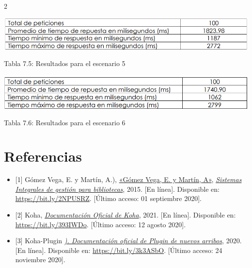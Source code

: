 \documentclass[12pt,spanish,Letterpaper,openany]{book}
\begin{document}
\begin {multicols}{2}
\begin {center}
\begin{minipage}[c]{\columnwidth}
\begin{center}\includegraphics[width=1\linewidth]{images/05_12} \end{center}
\vspace{0.01cm}
\footnotesize
\centering

Tabla 7.5: Resultados para el escenario 5

\end{minipage}

\end {center}

\begin {center}

\noindent\begin{minipage}[c]{\columnwidth}
\centering

\begin{center}\includegraphics[width=1\linewidth]{images/05_13} \end{center}
\vspace{0.01cm}
\footnotesize
\centering

Tabla 7.6: Resultados para el escenario 6

\end{minipage}

\end {center}

\hypertarget{referencias-4}{%
\section{Referencias}\label{referencias-4}}

\begin{itemize}
\item
  {[}1{]} Gómez Vega, E. y Martín, A.), \href{https://www.ntust.edu.tw/}{«Gómez Vega, E. y Martín, A»}, \href{https://bit.ly/3z0577S}{\emph{Sistemas Integrales de gestión para bibliotecas}}, 2015. {[}En línea{]}. Disponible en: \url{https://bit.ly/2NPUSRZ}. {[}Último acceso: 01 septiembre 2020{]}.
\item
  {[}2{]} Koha, \href{https://koha-community.org/documentation/}{\emph{Documentación Oficial de Koha}}, 2021. {[}En línea{]}. Disponible en: \url{https://bit.ly/393IWDo}. {[}Último acceso: 12 agosto 2020{]}.
\item
  {[}3{]} Koha-Plugin \href{https://github.com/\%20bywatersolutions/koha-plugin-coverflow/releases/}{\emph{). Documentación oficial de Plugin de nuevos arribos}}, 2020. {[}En línea{]}. Disponible en: \url{https://bit.ly/3k3ASbO}. {[}Último acceso: 24 noviembre 2020{]}.
\end{itemize}

\end {multicols}
\end{document}
